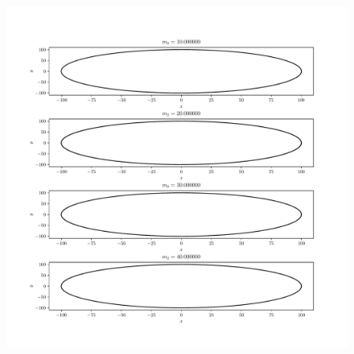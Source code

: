 \documentclass[a4paper]{article}
\begin{document}
\begin{figure}
\includegraphics[width=\textwidth]{MassPLOT.pdf}
\end{figure}
\end{document}
